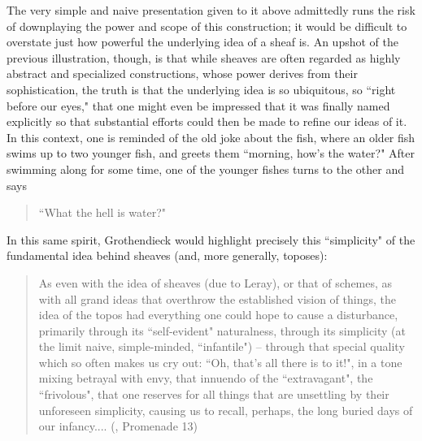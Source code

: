 \documentclass[11pt]{book}
\theoremstyle{definition}
\theoremstyle{definition}
\theoremstyle{definition}
\theoremstyle{theorem}
\theoremstyle{definition}
\begin{document}
	The very simple and naive presentation given to it above admittedly runs the risk of downplaying the power and scope of this construction; it would be difficult to overstate just how powerful the underlying idea of a sheaf is. An upshot of the previous illustration, though, is that while sheaves are often regarded as highly abstract and specialized constructions, whose power derives from their sophistication, the truth is that the underlying idea is so ubiquitous, so ``right before our eyes," that one might even be impressed that it was finally named explicitly so that substantial efforts could then be made to refine our ideas of it. In this context, one is reminded of the old joke about the fish, where an older fish swims up to two younger fish, and greets them ``morning, how's the water?" After swimming along for some time, one of the younger fishes turns to the other and says   
	\begin{quote}
		``What the hell is water?"
	\end{quote} 
	 In this same spirit, Grothendieck  would highlight precisely this ``simplicity" of the fundamental idea behind sheaves (and, more generally, toposes):  
	\begin{quote}
		As even with the idea of sheaves (due to Leray), or that of schemes, as with all grand ideas that overthrow the established vision of things, the idea of the topos had everything one could hope to cause a disturbance, primarily through its ``self-evident" naturalness, through its simplicity (at the limit naive, simple-minded,  ``infantile") -- through that special quality which so often makes us cry out: ``Oh, that's all there is to it!", in a tone mixing betrayal with envy, that innuendo of the ``extravagant", the ``frivolous", that one reserves for all things that are unsettling by their unforeseen simplicity, causing us to recall, perhaps, the long buried days of our infancy.... (\cite{grothendieck_recoltes_1986}, Promenade 13) 
	\end{quote}
\end{document}
